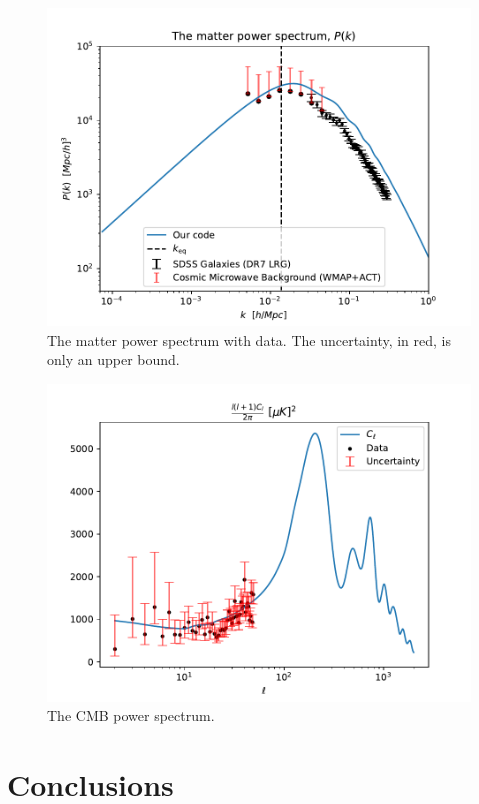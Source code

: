 \documentclass{aa}
\begin{document}
\begin{figure}[h!]
   \includegraphics[scale=0.6]{../figures/milestone4/matter_PS_data.pdf}
   \caption{The matter power spectrum with data. The uncertainty, in red, is only an upper bound.}\label{fig:m4_matter_PS_data}
\end{figure}

\begin{figure}[h!]
   \includegraphics[scale=0.6]{../figures/milestone4/cell.pdf}
   \caption{The CMB power spectrum.}\label{fig:m4_cell}
\end{figure}
\section{Conclusions}
\end{document}
